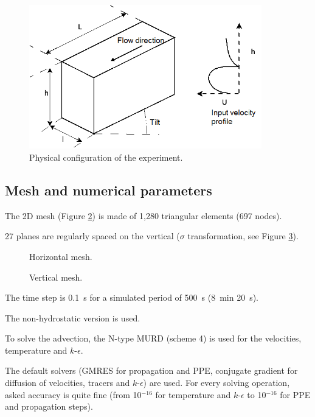 \begin{figure}[H]
 \centering
 \includegraphics[width=0.9\textwidth]{./img/exp_config.png}
 \caption{Physical configuration of the experiment.}
 \label{fig:Viollet:ExpConfig}
\end{figure}

\subsection{Mesh and numerical parameters}

The 2D mesh (Figure \ref{fig:Viollet:Mesh}) is made of 1,280 triangular elements
(697 nodes).

27 planes are regularly spaced on the vertical ($\sigma$ transformation,
see Figure \ref{fig:Viollet:MeshV}).

\begin{figure}[H]
 \centering
  \caption{Horizontal mesh.}\label{fig:Viollet:Mesh}
\end{figure}

\begin{figure}[H]
 \centering
  \caption{Vertical mesh.}\label{fig:Viollet:MeshV}
\end{figure}

The time step is 0.1~s for a simulated period of 500~s (8~min 20~s).

The non-hydrostatic version is used.

To solve the advection, the N-type MURD (scheme 4) is used for the velocities,
temperature and $k$-$\epsilon$.

The default solvers (GMRES for propagation and PPE, conjugate gradient for
diffusion of velocities, tracers and $k$-$\epsilon$) are used.
For every solving operation, asked accuracy is quite fine
(from 10$^{-16}$ for temperature and $k$-$\epsilon$ to 10$^{-16}$ for PPE and
propagation steps).

